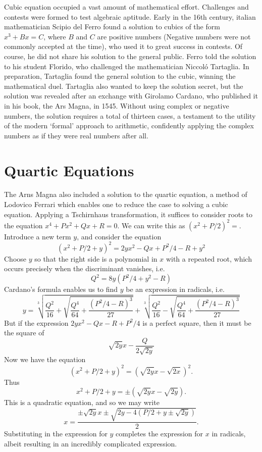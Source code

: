 Cubic equation occupied a vast amount of mathematical effort. Challenges and contests were formed to test algebraic aptitude. Early in the 16th century, italian mathematician Scipio del Ferro found a solution to cubics of the form $x^3 + Bx = C$, where $B$ and $C$ are positive numbers (Negative numbers were not commonly accepted at the time), who used it to great success in contests. Of course, he did not share his solution to the general public. Ferro told the solution to his student Florido, who challenged the mathematician Niccol\'{o} Tartaglia. In preparation, Tartaglia found the general solution to the cubic, winning the mathematical duel. Tartaglia also wanted to keep the solution secret, but the solution was revealed after an exchange with Girolamo Cardano, who published it in his book, the Ars Magna, in 1545. Without using complex or negative numbers, the solution requires a total of thirteen cases, a testament to the utility of the modern `formal' approach to arithmetic, confidently applying the complex numbers as if they were real numbers after all.

\section{Quartic Equations}

The Arns Magna also included a solution to the quartic equation, a method of Lodovico Ferrari which enables one to reduce the case to solving a cubic equation. Applying a Tschirnhaus transformation, it suffices to consider roots to the equation $x^4 + Px^2 + Qx + R = 0$. We can write this as $\left( x^2 + P/2 \right)^2 = $. Introduce a new term $y$, and consider the equation
%
\[ (x^2 + P/2 + y)^2 = 2yx^2 - Qx + P^2/4 - R + y^2 \]
%
Choose $y$ so that the right side is a polynomial in $x$ with a repeated root, which occurs precisely when the discriminant vanishes, i.e.
%
\[ Q^2 = 8y(P^2/4 + y^2 - R) \]
%
Cardano's formula enables us to find $y$ be an expression in radicals, i.e.
%
\[ y = \sqrt[3]{ \frac{Q^2}{16} + \sqrt{ \frac{Q^4}{64} + \frac{(P^2/4 - R)^3}{27}}} + \sqrt[3]{ \frac{Q^2}{16} - \sqrt{ \frac{Q^4}{64} + \frac{(P^2/4 - R)^3}{27}}} \]
%
But if the expression $2yx^2 -Qx - R + P^2/4$ is a perfect square, then it must be the square of
%
\[ \sqrt{2y}x - \frac{Q}{2\sqrt{2y}} \]
%
Now we have the equation
%
\[ (x^2 + P/2 + y)^2 = \left(\sqrt{2y}x - \sqrt{2x} \right)^2. \]
%
Thus
%
\[ x^2 + P/2 + y = \pm(\sqrt{2y}x - \sqrt{2y}). \]
%
This is a quadratic equation, and so we may write
\[ x = \frac{\pm \sqrt{2y} x \pm \sqrt{2y - 4(P/2 + y \pm \sqrt{2y})}}{2}. \]
%
Substituting in the expression for $y$ completes the expression for $x$ in radicals, albeit resulting in an incredibly complicated expression.

